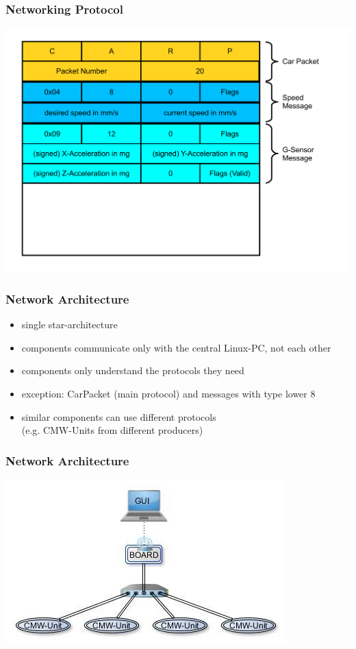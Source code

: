 \documentclass{beamer}
\begin{document}
\begin{frame}
	\frametitle{Networking Protocol}
	\includegraphics[scale=0.35]{figures/prot4.pdf}
\end{frame}


\begin{frame}
	\frametitle{Network Architecture}
	\begin{itemize}
		\item single star-architecture
		\item components communicate only with the central Linux-PC, not each other
		\item components only understand the protocols they need
		\item[] exception: CarPacket (main protocol) and messages with type lower 8
		\item similar components can use different protocols\\
		(e.g. CMW-Units from different producers)
	\end{itemize}
\end{frame}

\begin{frame}
	\frametitle{Network Architecture}
	\includegraphics[scale=0.7]{figures/connection.jpg}
\end{frame}
\end{document}
